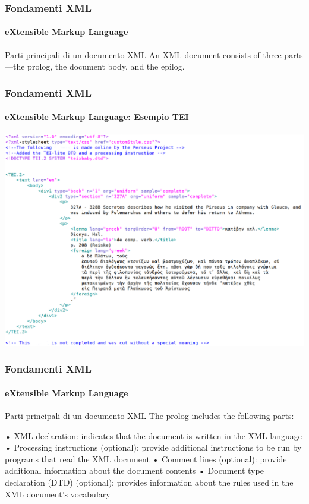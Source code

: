 \begin{frame}
	\frametitle{Fondamenti XML}
	\framesubtitle{eXtensible Markup Language}
	\addtocounter{nframe}{1}

	\begin{block}{Parti principali di un documento XML}
        An XML document consists of three parts—the prolog, the document body, and the
        epilog. 
	\end{block}

\end{frame}


\begin{frame}
	\frametitle{Fondamenti XML}
	\framesubtitle{eXtensible Markup Language: Esempio TEI}
	\addtocounter{nframe}{1}

	\begin{center}
		\includegraphics[width=1.1\textwidth]{imgs/TEI-PerseusExample.png}
	\end{center}

\end{frame}


\begin{frame}
	\frametitle{Fondamenti XML}
	\framesubtitle{eXtensible Markup Language}
	\addtocounter{nframe}{1}

	\begin{block}{Parti principali di un documento XML}
        The prolog includes the following parts:
        
        • XML declaration: indicates that the document is written in the XML language
        • Processing instructions (optional): provide additional instructions to be run by
        programs that read the XML document
        • Comment lines (optional): provide additional information about the document
        contents
        • Document type declaration (DTD) (optional): provides information about the rules
        used in the XML document’s vocabulary
	\end{block}

\end{frame}

